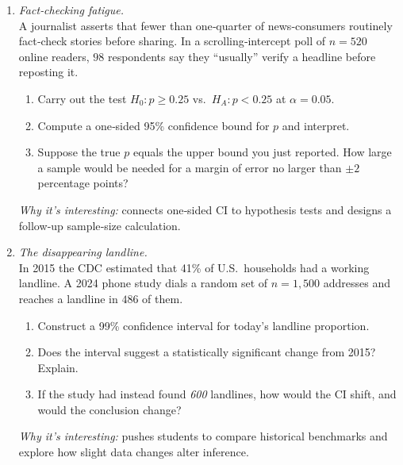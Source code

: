 \documentclass[11pt]{article}
\begin{document}
\begin{enumerate}[label=\textbf{Q\,\arabic*:}, start=6, left=0pt]

\item  \emph{Fact‑checking fatigue.}  \\
      A journalist asserts that fewer than one‑quarter of news‑consumers routinely fact‑check stories before sharing.  
      In a scrolling‑intercept poll of $n=520$ online readers, $98$ respondents say they “usually” verify a headline before reposting it.
      \begin{enumerate}[label=(\alph*)]
          \item Carry out the test $H_0{:}p \ge 0.25$ vs.\ $H_A{:}p < 0.25$ at $\alpha=0.05$.  
          \item Compute a one‑sided 95\% confidence bound for $p$ and interpret.  
          \item Suppose the true $p$ equals the upper bound you just reported.  How large a sample would be needed for a margin of error no larger than $\pm 2$ percentage points?
      \end{enumerate}
      \textit{Why it’s interesting:} connects one‑sided CI to hypothesis tests and designs a follow‑up sample‑size calculation.  

\item  \emph{The disappearing landline.}  \\
      In 2015 the CDC estimated that 41\% of U.S.\ households had a working landline.  
      A 2024 phone study dials a random set of $n=1{,}500$ addresses and reaches a landline in $486$ of them.
      \begin{enumerate}[label=(\alph*)]
          \item Construct a 99\% confidence interval for today’s landline proportion.  
          \item Does the interval suggest a statistically significant change from 2015?  Explain.  
          \item If the study had instead found \emph{600} landlines, how would the CI shift, and would the conclusion change?
      \end{enumerate}
      \textit{Why it’s interesting:} pushes students to compare historical benchmarks and explore how slight data changes alter inference.  


\end{enumerate}
\end{document}

